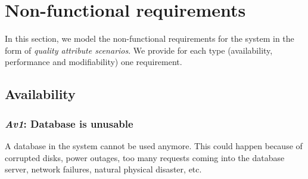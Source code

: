\documentclass[english]{sareport}
\begin{document}
\chapter{Non-functional requirements}\label{sec:non-functional}
In this section, we model the non-functional requirements for the system in the
form of \emph{quality attribute scenarios}. We provide for each type
(availability, performance and modifiability) one requirement.

\section{Availability}
\subsection{\emph{Av1}: Database is unusable}
A database in the system cannot be used anymore. This could happen because of
corrupted disks, power outages, too many requests coming into the database
server, network failures, natural physical disaster, etc.
\end{document}
